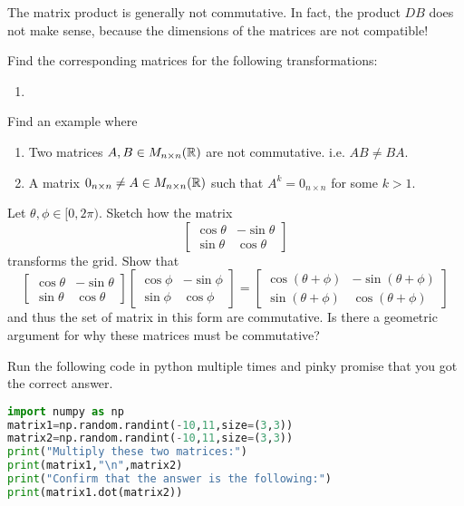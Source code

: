 \begin{remark}
	The matrix product is generally not commutative. In fact, the product $DB$ does not make sense, because the dimensions of the matrices are not compatible!
\end{remark}
\exercises
\begin{exerciselist}
	\item Find the corresponding matrices for the following transformations: \begin{enumerate}[label=(\alph*)]
		\item 
	\end{enumerate}
	\item Find an example where \begin{enumerate}[label=(\alph*)]
		\item Two matrices $A,B\in M_{n\times n}(\mathbb{R})$ are not commutative. i.e. $AB\neq BA$.
		\item A matrix $0_{n\times n}\neq A\in M_{n\times n }(\mathbb{R})$ such that $A^k=0_{n\times n}$ for some $k>1$.
	\end{enumerate}
	\item Let $\theta,\phi\in[0,2\pi)$. Sketch how the matrix \[\begin{bmatrix}
		\cos \theta & -\sin \theta\\
		\sin \theta & \cos \theta
	\end{bmatrix}
	\] transforms the grid. Show that \[
		\begin{bmatrix}
			\cos \theta & -\sin \theta\\
			\sin \theta & \cos \theta
		\end{bmatrix}
		\begin{bmatrix}
			\cos \phi & -\sin \phi\\
			\sin \phi & \cos \phi
		\end{bmatrix}
		=
		\begin{bmatrix}
			\cos (\theta+\phi) & -\sin (\theta+\phi)\\
			\sin (\theta+\phi) & \cos (\theta+\phi)
		\end{bmatrix}
	\]
	and thus the set of matrix in this form are commutative. Is there a geometric argument for why these matrices must be commutative? 
	\item Run the following code in python multiple times and pinky promise that you got the correct answer.\\ \begin{lstlisting}[language=Python]
import numpy as np
matrix1=np.random.randint(-10,11,size=(3,3))
matrix2=np.random.randint(-10,11,size=(3,3))
print("Multiply these two matrices:")
print(matrix1,"\n",matrix2)
print("Confirm that the answer is the following:")
print(matrix1.dot(matrix2))\end{lstlisting}
\end{exerciselist}
